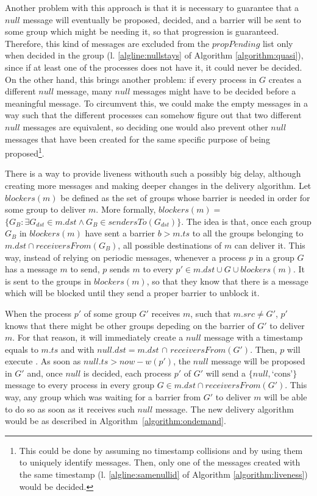 \documentclass[times, 10pt]{article}
\begin{document}
Another problem with this approach is that it is necessary to guarantee that a $null$ message will eventually be proposed, decided, and a barrier will be sent to some group which might be needing it, so that progression is guaranteed. Therefore, this kind of messages are excluded from the $propPending$ list only when decided in the group (l. \ref{algline:nullstays} of Algorithm \ref{algorithm:quasi}), since if at least one of the processes does not have it, it could never be decided. On the other hand, this brings another problem: if every process in $G$ creates a different $null$ message, many $null$ messages might have to be decided before a meaningful message. To circumvent this, we could make the empty messages in a way such that the different processes can somehow figure out that two different $null$ messages are equivalent, so deciding one would also prevent other $null$ messages that have been created for the same specific purpose of being proposed\footnote{This could be done by assuming no timestamp collisions and by using them to uniquely identify messages. Then, only one of the messages created with the same timestamp (l. \ref{algline:samenullid} of Algorithm \ref{algorithm:liveness}) would be decided.}.

There is a way to provide liveness withouth such a possibly big delay, although creating more messages and making deeper changes in the delivery algorithm. Let $blockers(m)$ be defined as the set of groups whose barrier is needed in order for some group to deliver $m$. More formally, $blockers(m) =$ \mbox{$\{G_B : \exists G_{dst} \in m.dst \wedge G_B \in sendersTo(G_{dst})\}$}. The idea is that, once each group $G_B$ in $blockers(m)$ have sent a barrier $b > m.ts$ to all the groups belonging to \mbox{$m.dst \cap receiversFrom(G_B)$}, all possible destinations of $m$ can deliver it. This way, instead of relying on periodic messages, whenever a process $p$ in a group $G$ has a message $m$ to send, $p$ sends $m$ to every $p' \in m.dst \cup G \cup blockers(m)$. It is sent to the groups in $blockers(m)$, so that they know that there is a message which will be blocked until they send a proper barrier to unblock it.

When the process $p'$ of some group $G'$ receives $m$, such that $m.src \neq G'$, $p'$ knows that there might be other groups depeding on the barrier of $G'$ to deliver $m$. For that reason, it will immediately create a $null$ message with a timestamp equals to $m.ts$ and with $null.dst = m.dst$ $\cap$ $receiversFrom(G')$. Then, $p$ will execute \mbox{}. As soon as $null.ts > now - w(p')$, the $null$ message will be proposed in $G'$ and, once $null$ is decided, each process $p'$ of $G'$ will send a $\{null, \text{`cons'}\}$ message to every process in every group \mbox{$G \in m.dst \cap receiversFrom(G')$}. This way, any group which was waiting for a barrier from $G'$ to deliver $m$ will be able to do so as soon as it receives such $null$ message. The new delivery algorithm would be as described in \mbox{Algorithm {\ref{algorithm:ondemand}}}.
\end{document}
